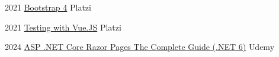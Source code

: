 \documentclass[letterpaper]{twentysecondcv} %
\begin{document}
{\begin{twenty}
        \twentyitem
        {2021}
        {\href{https://platzi.com/p/camurillo582/curso/1331-bootstrap/diploma/detalle/}
            {Bootstrap 4}
        }
        {Platzi}
        {}
        
        \twentyitem
        {2021}
        {\href{https://platzi.com/p/camurillo582/curso/1950-course/diploma/detalle/}
            {Testing with Vue.JS}
        }
        {Platzi}
        {}

        \twentyitem
        {2024}
        {\href{https://ude.my/UC-591f3b18-2bb5-405e-809f-f255c5c55927/}
            {ASP .NET Core Razor Pages The Complete Guide (.NET 6)}
        }
        {Udemy}
        {}

\end{twenty}
}


 \restoregeometry
\end{document}
